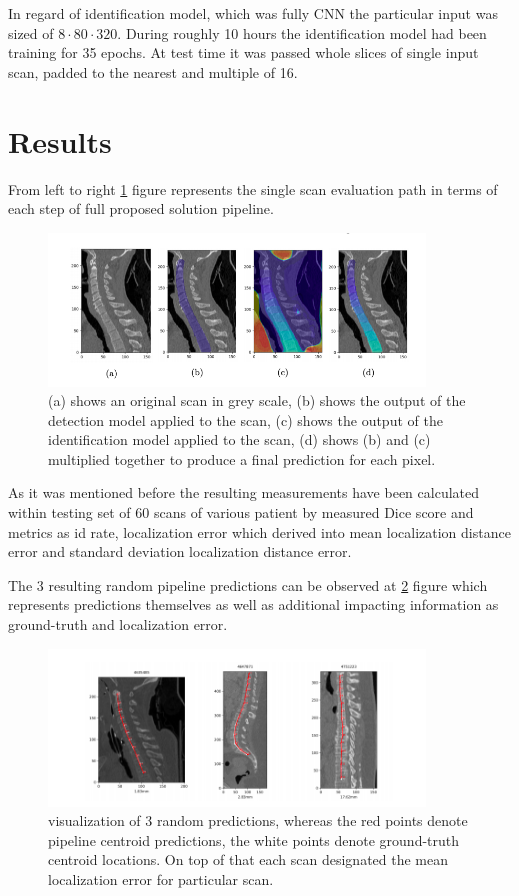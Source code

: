 In regard of identification model, which was fully CNN the particular input was sized of $8 \cdot 80 \cdot 320$. During roughly 10 hours the identification model had been training for 35 epochs. At test time it was passed whole slices of single input scan, padded to the nearest and multiple of 16.


\section{Results}
From left to right \ref{fig:step_step_predictions} figure represents the single scan evaluation path in terms of each step of full proposed solution pipeline. 

\begin{figure}[h]
    \centering \includegraphics[width=10cm]{images/step_step_predictions.png}
    \caption {(a) shows an original scan in grey scale, (b) shows the output of the detection model applied to the scan, (c) shows the output of the identification model
    applied to the scan, (d) shows (b) and (c) multiplied together to produce a final prediction for each pixel.}
    \label{fig:step_step_predictions}
\end{figure}

As it was mentioned before the resulting measurements have been calculated within testing set of 60 scans of various patient by measured Dice score and metrics as id rate, localization error which derived into mean localization distance error and standard deviation localization distance error.

The 3 resulting random pipeline predictions can be observed at \ref{fig:predictions} figure which represents predictions themselves as well as additional impacting information as ground-truth and localization error. 
\begin{figure}[h]
    \centering \includegraphics[width=10cm]{images/predictions.png}
    \caption {visualization of 3 random predictions, whereas the red points denote pipeline centroid predictions, the white points denote ground-truth centroid locations. On top of that each scan designated the mean localization error for particular scan.}
    \label{fig:predictions}
\end{figure}

